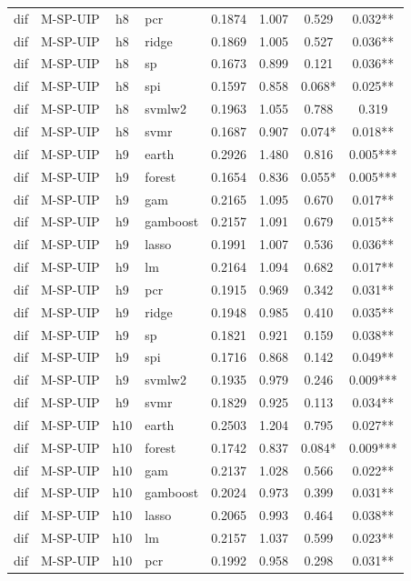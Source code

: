 \begin{ThreePartTable}
\begin{longtable}[t]{llclcccc}
dif & M-SP-UIP & h8 & pcr & 0.1874 & 1.007 & 0.529 & 0.032**\\
dif & M-SP-UIP & h8 & ridge & 0.1869 & 1.005 & 0.527 & 0.036**\\
dif & M-SP-UIP & h8 & sp & 0.1673 & 0.899 & 0.121 & 0.036**\\
dif & M-SP-UIP & h8 & spi & 0.1597 & 0.858 & 0.068* & 0.025**\\
dif & M-SP-UIP & h8 & svmlw2 & 0.1963 & 1.055 & 0.788 & 0.319\\
dif & M-SP-UIP & h8 & svmr & 0.1687 & 0.907 & 0.074* & 0.018**\\
\addlinespace
dif & M-SP-UIP & h9 & earth & 0.2926 & 1.480 & 0.816 & 0.005***\\
dif & M-SP-UIP & h9 & forest & 0.1654 & 0.836 & 0.055* & 0.005***\\
dif & M-SP-UIP & h9 & gam & 0.2165 & 1.095 & 0.670 & 0.017**\\
dif & M-SP-UIP & h9 & gamboost & 0.2157 & 1.091 & 0.679 & 0.015**\\
dif & M-SP-UIP & h9 & lasso & 0.1991 & 1.007 & 0.536 & 0.036**\\
dif & M-SP-UIP & h9 & lm & 0.2164 & 1.094 & 0.682 & 0.017**\\
dif & M-SP-UIP & h9 & pcr & 0.1915 & 0.969 & 0.342 & 0.031**\\
dif & M-SP-UIP & h9 & ridge & 0.1948 & 0.985 & 0.410 & 0.035**\\
dif & M-SP-UIP & h9 & sp & 0.1821 & 0.921 & 0.159 & 0.038**\\
dif & M-SP-UIP & h9 & spi & 0.1716 & 0.868 & 0.142 & 0.049**\\
dif & M-SP-UIP & h9 & svmlw2 & 0.1935 & 0.979 & 0.246 & 0.009***\\
dif & M-SP-UIP & h9 & svmr & 0.1829 & 0.925 & 0.113 & 0.034**\\
\addlinespace
dif & M-SP-UIP & h10 & earth & 0.2503 & 1.204 & 0.795 & 0.027**\\
dif & M-SP-UIP & h10 & forest & 0.1742 & 0.837 & 0.084* & 0.009***\\
dif & M-SP-UIP & h10 & gam & 0.2137 & 1.028 & 0.566 & 0.022**\\
dif & M-SP-UIP & h10 & gamboost & 0.2024 & 0.973 & 0.399 & 0.031**\\
dif & M-SP-UIP & h10 & lasso & 0.2065 & 0.993 & 0.464 & 0.038**\\
dif & M-SP-UIP & h10 & lm & 0.2157 & 1.037 & 0.599 & 0.023**\\
dif & M-SP-UIP & h10 & pcr & 0.1992 & 0.958 & 0.298 & 0.031**\\

\end{longtable}
\end{ThreePartTable}
